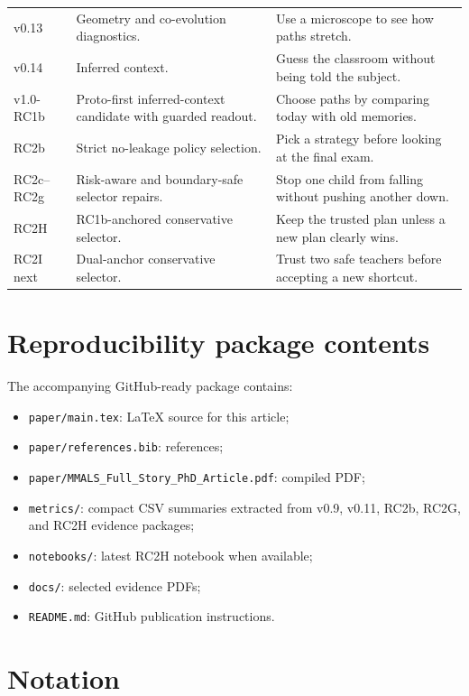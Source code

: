 \documentclass[11pt]{article}
\begin{document}
\begin{longtable}{p{}p{}p{}}
v0.13 & Geometry and co-evolution diagnostics. & Use a microscope to see how paths stretch. \\
v0.14 & Inferred context. & Guess the classroom without being told the subject. \\
v1.0-RC1b & Proto-first inferred-context candidate with guarded readout. & Choose paths by comparing today with old memories. \\
RC2b & Strict no-leakage policy selection. & Pick a strategy before looking at the final exam. \\
RC2c--RC2g & Risk-aware and boundary-safe selector repairs. & Stop one child from falling without pushing another down. \\
RC2H & RC1b-anchored conservative selector. & Keep the trusted plan unless a new plan clearly wins. \\
RC2I next & Dual-anchor conservative selector. & Trust two safe teachers before accepting a new shortcut. \\
\bottomrule
\end{longtable}

\section{Reproducibility package contents}

The accompanying GitHub-ready package contains:
\begin{itemize}[leftmargin=*]
  \item \texttt{paper/main.tex}: LaTeX source for this article;
  \item \texttt{paper/references.bib}: references;
  \item \texttt{paper/MMALS\_Full\_Story\_PhD\_Article.pdf}: compiled PDF;
  \item \texttt{metrics/}: compact CSV summaries extracted from v0.9, v0.11, RC2b, RC2G, and RC2H evidence packages;
  \item \texttt{notebooks/}: latest RC2H notebook when available;
  \item \texttt{docs/}: selected evidence PDFs;
  \item \texttt{README.md}: GitHub publication instructions.
\end{itemize}

\section{Notation}
\end{document}
